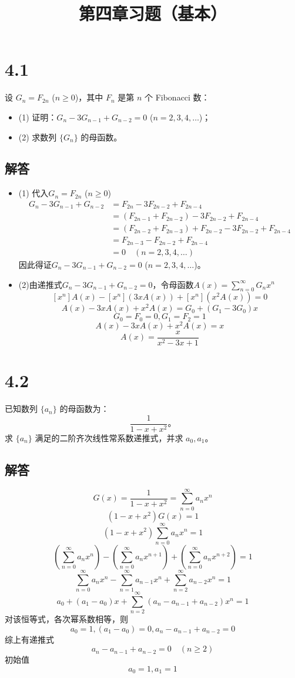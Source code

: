 \documentclass[12pt]{article}
\title{第四章习题（基本）}
\begin{document}
\maketitle

\section*{4.1}
设 \( G_n = F_{2n} \) (\( n \geq 0 \))，其中 \( F_n \) 是第 \( n \) 个 Fibonacci 数：
\begin{itemize}
    \item (1) 证明：\( G_n - 3G_{n-1} + G_{n-2} = 0 \) (\( n = 2, 3, 4, \dots \))；
    \item (2) 求数列 \(\{G_n\}\) 的母函数。
\end{itemize}

\subsection*{解答}
\begin{itemize}
    \item (1) 代入\( G_n = F_{2n} \) (\( n \geq 0 \))
    \begin{align}
     G_n - 3G_{n-1} + G_{n-2} &= F_{2n} - 3F_{2n-2} + F_{2n-4}\\
     &=(F_{2n-1} + F_{2n-2}) - 3F_{2n-2} + F_{2n-4}\\
     &=(F_{2n-2} + F_{2n-3}) + F_{2n-2} - 3F_{2n-2} + F_{2n-4}\\
     &=F_{2n-3} - F_{2n-2} + F_{2n-4}\\
     &=0 \quad (n = 2, 3, 4, \dots) 
    \end{align}
    因此得证\( G_n - 3G_{n-1} + G_{n-2} = 0 \) \quad (\( n = 2, 3, 4, \dots \))。
    \item (2)由递推式\( G_n - 3G_{n-1} + G_{n-2} = 0\)，令母函数\(A(x) = \sum_{n=0}^{\infty} G_nx^n\)
    \[[x^n]A(x)-[x^n](3xA(x))+[x^n](x^2A(x))=0\]
    \[A(x)-3xA(x)+x^2A(x)=G_0+(G_1-3G_0)x\]
    \[G_0 = F_0 = 0, G_1 = F_2 = 1\]
    \[A(x)-3xA(x)+x^2A(x)=x\]
    \[A(x) = \frac{x}{x^2-3x+1}\]
\end{itemize}

\section*{4.2}
已知数列 \(\{a_n\}\) 的母函数为：
\[
\frac{1}{1 - x + x^2}。
\]
求 \(\{a_n\}\) 满足的二阶齐次线性常系数递推式，并求 \(a_0, a_1\)。
\subsection*{解答}
\[G(x) = \frac{1}{1 - x + x^2} = \sum_{n=0}^{\infty} a_nx^n\]
\[(1 - x + x^2)G(x)=1\]
\[(1 - x + x^2) \sum_{n=0}^\infty a_n x^n = 1\]
\[
\left( \sum_{n=0}^\infty a_n x^n \right)
- \left( \sum_{n=0}^\infty a_n x^{n+1} \right)
+ \left( \sum_{n=0}^\infty a_n x^{n+2} \right) = 1
\]
\[
\sum_{n=0}^\infty a_n x^n - \sum_{n=1}^\infty a_{n-1} x^n + \sum_{n=2}^\infty a_{n-2} x^n = 1
\]
\[
a_0 + (a_1-a_0)x + \sum_{n=2}^\infty \left( a_n - a_{n-1} + a_{n-2} \right) x^n = 1
\]
对该恒等式，各次幂系数相等，则
\[a_0 =1, (a_1-a_0)=0,  a_n - a_{n-1} + a_{n-2} = 0\]
综上有递推式\[a_n - a_{n-1} + a_{n-2} = 0 \quad (n \geq 2)\]
初始值\[a_0 =1, a_1=1\]
\end{document}
